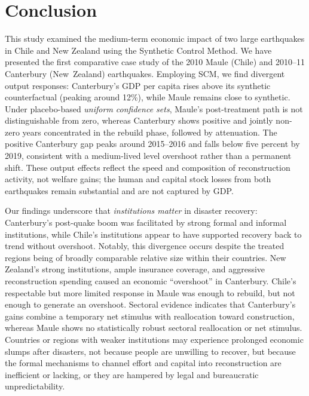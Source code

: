 \documentclass[12pt]{article}
\begin{document}
\section{Conclusion}
This study examined the medium-term economic impact of two large earthquakes in Chile and New Zealand using the Synthetic Control Method. We have presented the first comparative case study of the 2010 Maule (Chile) and 2010--11 Canterbury (New~Zealand) earthquakes. Employing SCM, we find divergent output responses: Canterbury's GDP per capita rises above its synthetic counterfactual (peaking around 12\%), while Maule remains close to synthetic. Under placebo-based \emph{uniform confidence sets}, Maule's post-treatment path is not distinguishable from zero, whereas Canterbury shows positive and jointly non-zero years concentrated in the rebuild phase, followed by attenuation. The positive Canterbury gap peaks around 2015--2016 and falls below five percent by 2019, consistent with a medium-lived level overshoot rather than a permanent shift. These output effects reflect the speed and composition of reconstruction activity, not welfare gains; the human and capital stock losses from both earthquakes remain substantial and are not captured by GDP. 

Our findings underscore that \emph{institutions matter} in disaster recovery: Canterbury's post-quake boom was facilitated by strong formal and informal institutions, while Chile's institutions appear to have supported recovery back to trend without overshoot. Notably, this divergence occurs despite the treated regions being of broadly comparable relative size within their countries. New Zealand’s strong institutions, ample insurance coverage, and aggressive reconstruction spending caused an economic “overshoot” in Canterbury. Chile’s respectable but more limited response in Maule was enough to rebuild, but not enough to generate an overshoot. Sectoral evidence indicates that Canterbury’s gains combine a temporary net stimulus with reallocation toward construction, whereas Maule shows no statistically robust sectoral reallocation or net stimulus. Countries or regions with weaker institutions may experience prolonged economic slumps after disasters, not because people are unwilling to recover, but because the formal mechanisms to channel effort and capital into reconstruction are inefficient or lacking, or they are hampered by legal and bureaucratic unpredictability.
\end{document}
